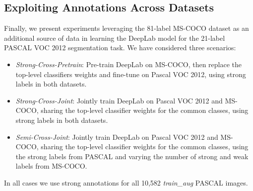 

\subsection{Exploiting Annotations Across Datasets}
\label{sec:cross_dataset}

Finally, we present experiments leveraging the 81-label MS-COCO
dataset as an additional source of data in learning the DeepLab model
for the 21-label PASCAL VOC 2012 segmentation task. We have considered
three scenarios:
\begin{itemize}
\item \textsl{Strong-Cross-Pretrain}: Pre-train DeepLab on MS-COCO,
  then replace the top-level classifiers weights and fine-tune on
  Pascal VOC 2012, using strong labels in both datasets.
\item \textsl{Strong-Cross-Joint}: Jointly train DeepLab on Pascal VOC
  2012 and MS-COCO, sharing the top-level classifier weights for the
  common classes, using strong labels in both datasets.
\item \textsl{Semi-Cross-Joint}: Jointly train DeepLab on Pascal VOC
  2012 and MS-COCO, sharing the top-level classifier weights for the
  common classes, using the strong labels from PASCAL and varying the
  number of strong and weak labels from MS-COCO.
\end{itemize}
In all cases we use strong annotations for all 10,582
\textsl{train\_aug} PASCAL images.

